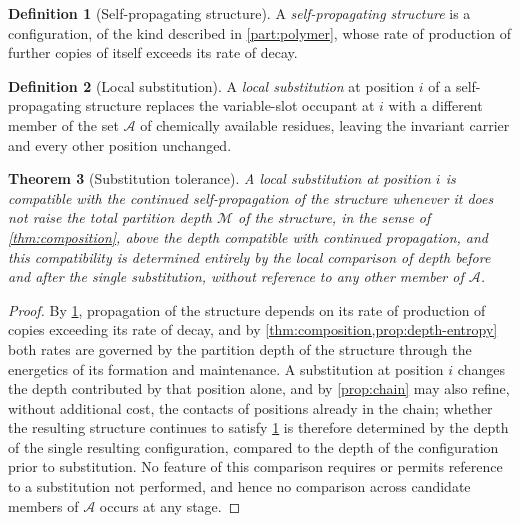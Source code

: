 \documentclass[11pt,twocolumn,a4paper]{article}
\theoremstyle{plain}
\newtheorem{theorem}{Theorem}[section]
\theoremstyle{definition}
\newtheorem{definition}[theorem]{Definition}
\theoremstyle{remark}
\newcommand{\Depth}{\mathcal{M}}
\newcommand{\Resset}{\mathcal{A}}
\begin{document}
\begin{definition}[Self-propagating structure]
\label{def:selfprop}
A \emph{self-propagating structure} is a configuration, of the kind
described in \cref{part:polymer}, whose rate of production of further
copies of itself exceeds its rate of decay.
\end{definition}

\begin{definition}[Local substitution]
\label{def:substitution}
A \emph{local substitution} at position $i$ of a self-propagating structure
replaces the variable-slot occupant at $i$ with a different member of the
set $\Resset$ of chemically available residues, leaving the invariant
carrier and every other position unchanged.
\end{definition}

\begin{theorem}[Substitution tolerance]
\label{thm:substitution-tolerance}
A local substitution at position $i$ is compatible with the continued
self-propagation of the structure whenever it does not raise the total
partition depth $\Depth$ of the structure, in the sense of
\cref{thm:composition}, above the depth compatible with continued
propagation, and this compatibility is determined entirely by the local
comparison of depth before and after the single substitution, without
reference to any other member of $\Resset$.
\end{theorem}

\begin{proof}
By \cref{def:selfprop}, propagation of the structure depends on its rate of
production of copies exceeding its rate of decay, and by
\cref{thm:composition,prop:depth-entropy} both rates are governed by the
partition depth of the structure through the energetics of its formation
and maintenance. A substitution at position $i$ changes the depth
contributed by that position alone, and by \cref{prop:chain} may also
refine, without additional cost, the contacts of positions already in the
chain; whether the resulting structure continues to satisfy
\cref{def:selfprop} is therefore determined by the depth of the single
resulting configuration, compared to the depth of the configuration prior
to substitution. No feature of this comparison requires or permits
reference to a substitution not performed, and hence no comparison across
candidate members of $\Resset$ occurs at any stage.
\end{proof}
\end{document}
